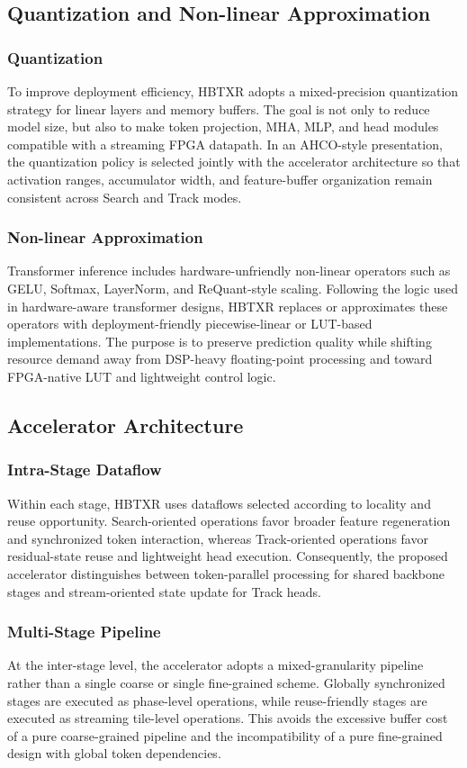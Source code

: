 \documentclass[journal]{IEEEtran}
\begin{document}
\subsection{Quantization and Non-linear Approximation}
\subsubsection{Quantization}
To improve deployment efficiency, HBTXR adopts a mixed-precision quantization strategy for linear layers and memory buffers. The goal is not only to reduce model size, but also to make token projection, MHA, MLP, and head modules compatible with a streaming FPGA datapath. In an AHCO-style presentation, the quantization policy is selected jointly with the accelerator architecture so that activation ranges, accumulator width, and feature-buffer organization remain consistent across Search and Track modes.

\subsubsection{Non-linear Approximation}
Transformer inference includes hardware-unfriendly non-linear operators such as GELU, Softmax, LayerNorm, and ReQuant-style scaling. Following the logic used in hardware-aware transformer designs, HBTXR replaces or approximates these operators with deployment-friendly piecewise-linear or LUT-based implementations. The purpose is to preserve prediction quality while shifting resource demand away from DSP-heavy floating-point processing and toward FPGA-native LUT and lightweight control logic.

\subsection{Accelerator Architecture}
\subsubsection{Intra-Stage Dataflow}
Within each stage, HBTXR uses dataflows selected according to locality and reuse opportunity. Search-oriented operations favor broader feature regeneration and synchronized token interaction, whereas Track-oriented operations favor residual-state reuse and lightweight head execution. Consequently, the proposed accelerator distinguishes between token-parallel processing for shared backbone stages and stream-oriented state update for Track heads.

\subsubsection{Multi-Stage Pipeline}
At the inter-stage level, the accelerator adopts a mixed-granularity pipeline rather than a single coarse or single fine-grained scheme. Globally synchronized stages are executed as phase-level operations, while reuse-friendly stages are executed as streaming tile-level operations. This avoids the excessive buffer cost of a pure coarse-grained pipeline and the incompatibility of a pure fine-grained design with global token dependencies.
\end{document}
